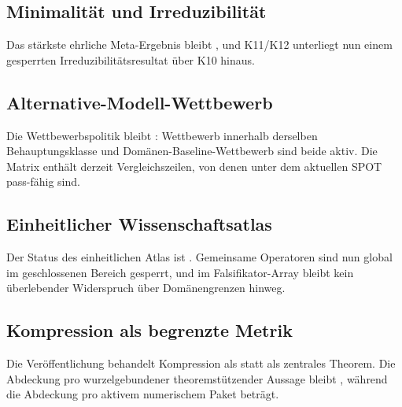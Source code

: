 \subsection{Minimalität und Irreduzibilität}
Das stärkste ehrliche Meta-Ergebnis bleibt , und K11/K12 unterliegt nun einem gesperrten Irreduzibilitätsresultat über K10 hinaus.

\subsection{Alternative-Modell-Wettbewerb}
Die Wettbewerbspolitik bleibt : Wettbewerb innerhalb derselben Behauptungsklasse und Domänen-Baseline-Wettbewerb sind beide aktiv. Die Matrix enthält derzeit  Vergleichszeilen, von denen  unter dem aktuellen SPOT pass-fähig sind.

\subsection{Einheitlicher Wissenschaftsatlas}
Der Status des einheitlichen Atlas ist . Gemeinsame Operatoren sind nun global im geschlossenen Bereich gesperrt, und im Falsifikator-Array bleibt kein überlebender Widerspruch über Domänengrenzen hinweg.

\subsection{Kompression als begrenzte Metrik}
Die Veröffentlichung behandelt Kompression als  statt als zentrales Theorem.
Die Abdeckung pro wurzelgebundener theoremstützender Aussage bleibt , während die Abdeckung pro aktivem numerischem Paket  beträgt.
